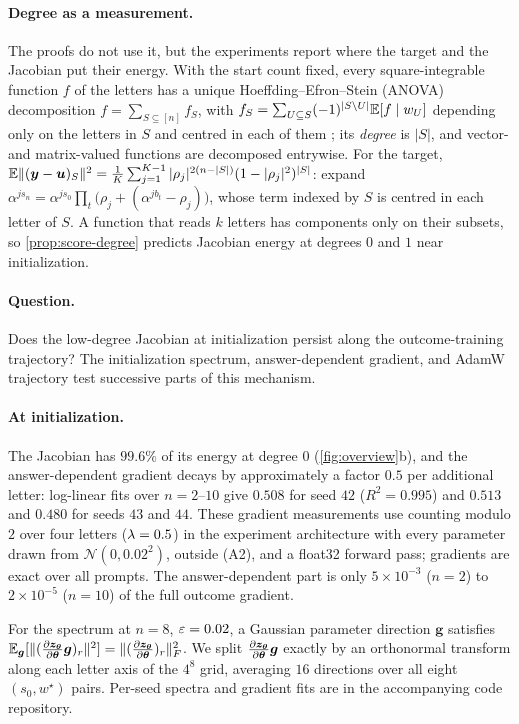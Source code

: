 \paragraph{Degree as a measurement.} The proofs do not use it, but the experiments report where the target and the Jacobian put their
energy. With the start count fixed, every square-integrable function $f$ of the letters has a unique Hoeffding--Efron--Stein (ANOVA)
decomposition $f=\sum_{S\subseteq[n]}f_S$, with $f_S=\sum_{U\subseteq S}(-1)^{|S\setminus U|}\mathbb E[f\mid w_U]$ depending only on the letters in $S$ and centred in each
of them \citep{hoeffding1948class,efron1981jackknife,odonnell2014analysis}; its \emph{degree} is $|S|$, and vector- and matrix-valued functions are
decomposed entrywise. For the target, $\mathbb E\|(\bm y-\bm u)_S\|^2=\frac{1}{K}\sum_{j=1}^{K-1}|\rho_j|^{2(n-|S|)}(1-|\rho_j|^2)^{|S|}$: expand
$\alpha^{js_n}=\alpha^{js_0}\prod_t\bigl(\rho_j+(\alpha^{jb_t}-\rho_j)\bigr)$, whose term indexed by $S$ is centred in each letter of $S$. A function that reads $k$ letters
has components only on their subsets, so \cref{prop:score-degree} predicts Jacobian energy at degrees $0$ and $1$ near initialization.

\paragraph{Question.} Does the low-degree Jacobian at initialization persist along the outcome-training trajectory?
The initialization spectrum, answer-dependent gradient, and AdamW trajectory test successive parts of this mechanism.

\paragraph{At initialization.} The Jacobian has $99.6\%$ of its energy at degree $0$ (\cref{fig:overview}b), and the answer-dependent
gradient decays by approximately a factor $0.5$ per additional letter: log-linear fits over $n=2$--$10$ give $0.508$ for seed $42$
($R^2=0.995$) and $0.513$ and $0.480$ for seeds $43$ and $44$. These gradient measurements use
counting modulo $2$ over four letters ($\lambda=0.5$) in the experiment architecture with every parameter drawn from
$\mathcal N(0,0.02^2)$, outside (A2), and a float32 forward pass; gradients are exact over all prompts. The answer-dependent part is only
$5\times10^{-3}$ ($n=2$) to $2\times10^{-5}$ ($n=10$) of the full outcome gradient.

For the spectrum at $n=8$, $\varepsilon=0.02$, a Gaussian parameter direction $\bm g$ satisfies
$\E_{\bm g}[\|(\Jz\bm g)_r\|^2]=\|(\Jz)_r\|_F^2$.
We split $\Jz\bm g$ exactly by an orthonormal transform along each letter axis of the $4^8$ grid,
averaging $16$ directions over all eight $(s_0,w^\star)$ pairs. Per-seed spectra and gradient fits are in the accompanying code repository.




